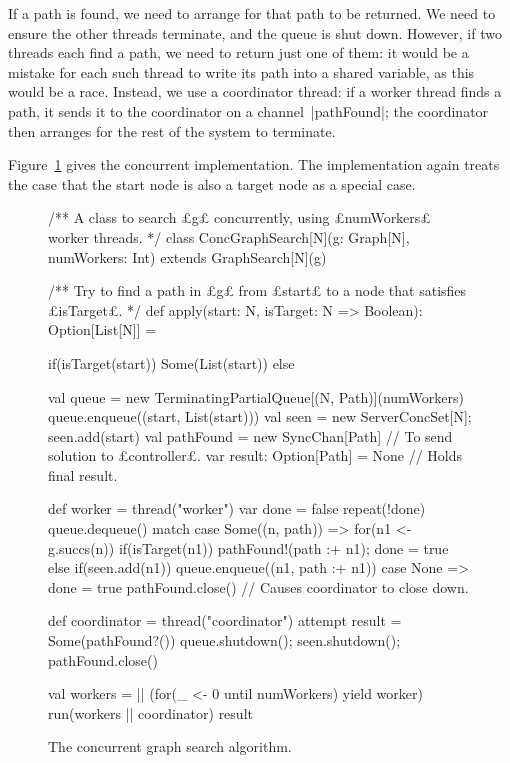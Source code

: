 If a path is found, we need to arrange for that path to be returned.  We need
to ensure the other threads terminate, and the queue is shut down.  However,
if two threads each find a path, we need to return just one of them: it would
be a mistake for each such thread to write its path into a shared variable, as
this would be a race.  Instead, we use a coordinator thread: if a worker
thread finds a path, it sends it to the coordinator on a channel~|pathFound|;
the coordinator then arranges for the rest of the system to terminate.

Figure~\ref{fig:graph-search-conc} gives the concurrent implementation.  The
implementation again treats the case that the start node is also a target node
as a special case. 



\begin{figure}
\begin{scala}
/** A class to search £g£ concurrently, using £numWorkers£ worker threads. */
class ConcGraphSearch[N](g: Graph[N], numWorkers: Int) 
    extends GraphSearch[N](g){
  /** Try to find a path in £g£ from £start£ to a node that satisfies £isTarget£. */
  def apply(start: N, isTarget: N => Boolean): Option[List[N]] = {
    if(isTarget(start)) Some(List(start))
    else{
      val queue = new TerminatingPartialQueue[(N, Path)](numWorkers)
      queue.enqueue((start, List(start)))
      val seen = new ServerConcSet[N]; seen.add(start)
      val pathFound = new SyncChan[Path] // To send solution to £controller£.
      var result: Option[Path] = None // Holds final result. 

      def worker = thread("worker"){
        var done = false
        repeat(!done){
          queue.dequeue() match{
            case Some((n, path)) =>
              for(n1 <- g.succs(n)){
                if(isTarget(n1)){ pathFound!(path :+ n1); done = true } 
                else if(seen.add(n1)) queue.enqueue((n1, path :+ n1))
              }
            case None => done = true
          }
        }
        pathFound.close() // Causes coordinator to close down.
      }

      def coordinator = thread("coordinator"){
        attempt{ result = Some(pathFound?()) }{ }
        queue.shutdown(); seen.shutdown(); pathFound.close()
      }

      val workers = || (for(_ <- 0 until numWorkers) yield worker)
      run(workers || coordinator)
      result
    }
  }
}
\end{scala}
\caption{The concurrent graph search algorithm.}
\label{fig:graph-search-conc}
\end{figure}


